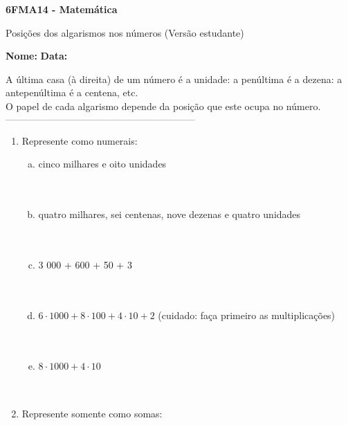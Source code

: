\documentclass[a4paper,14pt]{article}
\begin{document}
	
	\noindent\textbf{6FMA14 - Matemática} 
	
	\begin{center}Posições dos algarismos nos números (Versão estudante)
	\end{center}
	
	\noindent\textbf{Nome:} \underline{\hspace{10cm}}
	\noindent\textbf{Data:} \underline{\hspace{4cm}}
	
	
	\begin{multicols}{2}
		\noindent A última casa (à direita) de um número é a unidade: a penúltima é a dezena: a antepenúltima é a centena, etc. \\
		O papel de cada algarismo depende da posição que este ocupa no número.
		\noindent\textsubscript{-----------------------------------------------------------------------}
		\begin{enumerate} 
			\item Represente como numerais:
			\begin{enumerate}[a)]
				\item cinco milhares e oito unidades \\\\\\
				\item quatro milhares, sei centenas, nove dezenas e quatro unidades \\\\\\
				\item 3 000 + 600 + 50 + 3 \\\\\\
				\item $6 \cdot 1 000 + 8 \cdot 100 + 4 \cdot 10 + 2$ (cuidado: faça primeiro as multiplicações) \\\\\\
				\item $8 \cdot 1 000 + 4 \cdot 10$ \\\\\\
			\end{enumerate}
			\item Represente somente como somas:

\end{enumerate}
\end{multicols}
\end{document}
